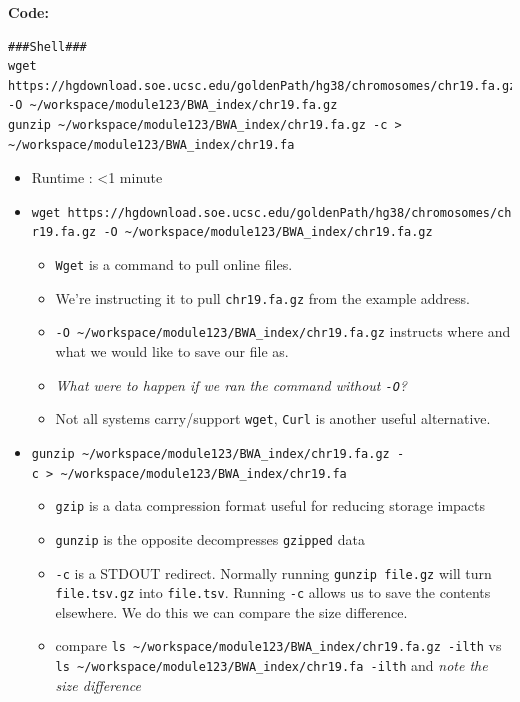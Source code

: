 \documentclass[
]{book}
\providecommand{\tightlist}{%
  \setlength{\itemsep}{0pt}\setlength{\parskip}{0pt}}
\begin{document}
\textbf{Code:}

\begin{verbatim}
###Shell###
wget https://hgdownload.soe.ucsc.edu/goldenPath/hg38/chromosomes/chr19.fa.gz -O ~/workspace/module123/BWA_index/chr19.fa.gz
gunzip ~/workspace/module123/BWA_index/chr19.fa.gz -c > ~/workspace/module123/BWA_index/chr19.fa
\end{verbatim}

\begin{itemize}
\item
  Runtime : \textless1 minute
\item
  \texttt{wget\ https://hgdownload.soe.ucsc.edu/goldenPath/hg38/chromosomes/chr19.fa.gz\ -O\ \textasciitilde{}/workspace/module123/BWA\_index/chr19.fa.gz}

  \begin{itemize}
  \tightlist
  \item
    \texttt{Wget} is a command to pull online files.
  \item
    We're instructing it to pull \texttt{chr19.fa.gz} from the example address.
  \item
    \texttt{-O\ \textasciitilde{}/workspace/module123/BWA\_index/chr19.fa.gz} instructs where and what we would like to save our file as.
  \item
    \emph{What were to happen if we ran the command without \texttt{-O}?}
  \item
    Not all systems carry/support \texttt{wget}, \texttt{Curl} is another useful alternative.
  \end{itemize}
\item
  \texttt{gunzip\ \textasciitilde{}/workspace/module123/BWA\_index/chr19.fa.gz\ -c\ \textgreater{}\ \textasciitilde{}/workspace/module123/BWA\_index/chr19.fa}

  \begin{itemize}
  \tightlist
  \item
    \texttt{gzip} is a data compression format useful for reducing storage impacts
  \item
    \texttt{gunzip} is the opposite decompresses \texttt{gzipped} data
  \item
    \texttt{-c} is a STDOUT redirect. Normally running \texttt{gunzip\ file.gz} will turn \texttt{file.tsv.gz} into \texttt{file.tsv}. Running \texttt{-c} allows us to save the contents elsewhere. We do this we can compare the size difference.
  \item
    compare \texttt{ls\ \textasciitilde{}/workspace/module123/BWA\_index/chr19.fa.gz\ -ilth} vs \texttt{ls\ \textasciitilde{}/workspace/module123/BWA\_index/chr19.fa\ -ilth} and \emph{note the size difference}
  \end{itemize}
\end{itemize}
\end{document}
